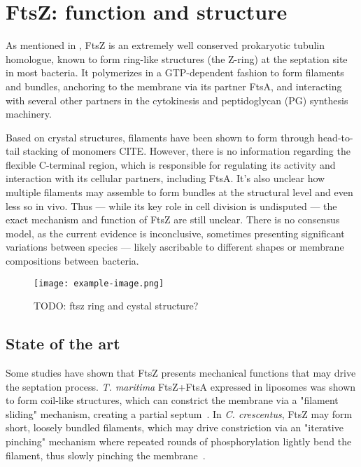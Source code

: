 \chapter{FtsZ: function and structure}\label{ftsz}

As mentioned in , FtsZ is an extremely well conserved prokaryotic tubulin homologue, known to form ring-like structures (the Z-ring) at the septation site in most bacteria.
It polymerizes in a GTP-dependent fashion to form filaments and bundles, anchoring to the membrane via its partner FtsA, and interacting with several other partners in the cytokinesis and peptidoglycan (PG) synthesis machinery.

Based on crystal structures, filaments have been shown to form through head-to-tail stacking of monomers CITE.
However, there is no information regarding the flexible C-terminal region, which is responsible for regulating its activity and interaction with its cellular partners, including FtsA.
It's also unclear how multiple filaments may assemble to form bundles at the structural level and even less so in vivo.
Thus --- while its key role in cell division is undisputed --- the exact mechanism and function of FtsZ are still unclear.
There is no consensus model, as the current evidence is inconclusive, sometimes presenting significant variations between species --- likely ascribable to different shapes or membrane compositions between bacteria.

\begin{figure}[ht]
    \centering
    \texttt{[image: example-image.png]}
    \caption{TODO: ftsz ring and cystal structure?}
    \label{fig:ftsz_ring}
\end{figure}

\localtableofcontents

\section{State of the art}

Some studies have shown that FtsZ presents mechanical functions that may drive the septation process.
\textit{T. maritima} FtsZ+FtsA expressed in liposomes was shown to form coil-like structures, which can constrict the membrane via a "filament sliding" mechanism, creating a partial septum~\cite{szwedziakArchitectureRingFormed2014}.
In \textit{C. crescentus}, FtsZ may form short, loosely bundled filaments, which may drive constriction via an "iterative pinching" mechanism where repeated rounds of phosphorylation lightly bend the filament, thus slowly pinching the membrane~\cite{liStructureFtsZFilaments2007}.

